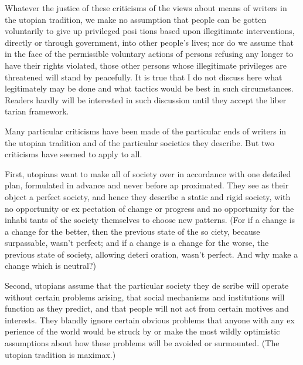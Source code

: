 \documentclass[11pt,openany]{book}
\begin{document}
Whatever the justice of these criticisms of the views about means of writers in the utopian tradition, we make no assumption that people can be gotten voluntarily to give up privileged posi tions based upon illegitimate interventions, directly or through government, into other people's lives; nor do we assume that in the face of the permissible voluntary actions of persons refusing any longer to have their rights violated, those other persons whose illegitimate privileges are threatened will stand by peacefully. It is true that I do not discuss here what legitimately may be done and what tactics would be best in such circumstances. Readers hardly will be interested in such discussion until they accept the liber tarian framework. 

Many particular criticisms have been made of the particular ends of writers in the utopian tradition and of the particular societies they describe. But two criticisms have seemed to apply to all. 

First, utopians want to make all of society over in accordance with one detailed plan, formulated in advance and never before ap proximated. They see as their object a perfect society, and hence they describe a static and rigid society, with no opportunity or ex pectation of change or progress and no opportunity for the inhabi tants of the society themselves to choose new patterns. (For if a change is a change for the better, then the previous state of the so ciety, because surpassable, wasn't perfect; and if a change is a change for the worse, the previous state of society, allowing deteri oration, wasn't perfect. And why make a change which is neutral?) 

Second, utopians assume that the particular society they de scribe will operate without certain problems arising, that social mechanisms and institutions will function as they predict, and that people will not act from certain motives and interests. They blandly ignore certain obvious problems that anyone with any ex perience of the world would be struck by or make the most wildly optimistic assumptions about how these problems will be avoided or surmounted. (The utopian tradition is maximax.) 
\end{document}
